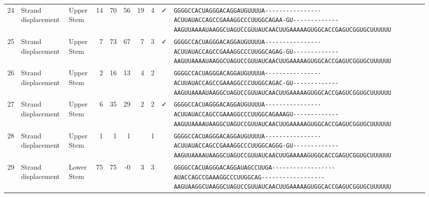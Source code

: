 \begin{tabular}{rllrrrrrcl}
 24 & Strand displacement & Upper Stem & 14 & 70 & 56 & 19 & 4 & ✓ &
 \color{ucsfblack}\verb|GGGGCCACUAGGGACAGGAU|\color{ucsfblue}\verb|GUUUUA----------------ACUU|\color{ucsfpurple}\verb|AUACCAGCCGAAAGGCCCUUGGCAG|\color{ucsfblue}\verb|AA-GU-------------AAGUUAAAAU|\color{ucsfnavy}\verb|AAGGCUAGUCCGU|\color{ucsfteal}\verb|UAUCAACUUGAAAAAGUGGCACCGAGUCGGUGC|\color{ucsfblack}\verb|UUUUUU| \\

 25 & Strand displacement & Upper Stem & 7 & 73 & 67 & 7 & 3 & ✓ &
 \color{ucsfblack}\verb|GGGGCCACUAGGGACAGGAU|\color{ucsfblue}\verb|GUUUUA----------------ACUU|\color{ucsfpurple}\verb|AUACCAGCCGAAAGGCCCUUGGCAG|\color{ucsfblue}\verb|AG-GU-------------AAGUUAAAAU|\color{ucsfnavy}\verb|AAGGCUAGUCCGU|\color{ucsfteal}\verb|UAUCAACUUGAAAAAGUGGCACCGAGUCGGUGC|\color{ucsfblack}\verb|UUUUUU| \\

 26 & Strand displacement & Upper Stem & 2 & 16 & 13 & 4 & 2 &  &
 \color{ucsfblack}\verb|GGGGCCACUAGGGACAGGAU|\color{ucsfblue}\verb|GUUUUA----------------ACUU|\color{ucsfpurple}\verb|AUACCAGCCGAAAGGCCCUUGGCAG|\color{ucsfblue}\verb|AC-GU-------------AAGUUAAAAU|\color{ucsfnavy}\verb|AAGGCUAGUCCGU|\color{ucsfteal}\verb|UAUCAACUUGAAAAAGUGGCACCGAGUCGGUGC|\color{ucsfblack}\verb|UUUUUU| \\

 27 & Strand displacement & Upper Stem & 6 & 35 & 29 & 2 & 2 & ✓ &
 \color{ucsfblack}\verb|GGGGCCACUAGGGACAGGAU|\color{ucsfblue}\verb|GUUUUA----------------ACUU|\color{ucsfpurple}\verb|AUACCAGCCGAAAGGCCCUUGGCAG|\color{ucsfblue}\verb|AAAGU-------------AAGUUAAAAU|\color{ucsfnavy}\verb|AAGGCUAGUCCGU|\color{ucsfteal}\verb|UAUCAACUUGAAAAAGUGGCACCGAGUCGGUGC|\color{ucsfblack}\verb|UUUUUU| \\

 28 & Strand displacement & Upper Stem & 1 & 1 & 1 &  & 1 &  &
 \color{ucsfblack}\verb|GGGGCCACUAGGGACAGGAU|\color{ucsfblue}\verb|GUUUUA----------------ACUU|\color{ucsfpurple}\verb|AUACCAGCCGAAAGGCCCUUGGCAG|\color{ucsfblue}\verb|GG-GU-------------AAGUUAAAAU|\color{ucsfnavy}\verb|AAGGCUAGUCCGU|\color{ucsfteal}\verb|UAUCAACUUGAAAAAGUGGCACCGAGUCGGUGC|\color{ucsfblack}\verb|UUUUUU| \\

 29 & Strand displacement & Lower Stem & 75 & 75 & -0 & 3 & 3 &  &
 \color{ucsfblack}\verb|GGGGCCACUAGGGACAGGAU|\color{ucsfblue}\verb|AGCCUUGA------------------|\color{ucsfpurple}\verb|AUACCAGCCGAAAGGCCCUUGGCAG|\color{ucsfblue}\verb|------------------AAGUAAGGCU|\color{ucsfnavy}\verb|AAGGCUAGUCCGU|\color{ucsfteal}\verb|UAUCAACUUGAAAAAGUGGCACCGAGUCGGUGC|\color{ucsfblack}\verb|UUUUUU| \\


\end{tabular}
